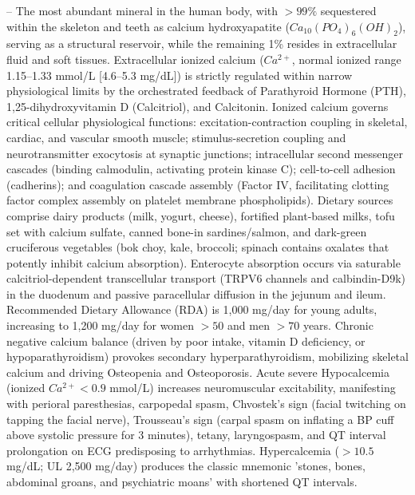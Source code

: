 -- The most abundant mineral in the human body, with $>99\%$ sequestered within the skeleton and teeth as calcium hydroxyapatite ($Ca_{10}(PO_4)_6(OH)_2$), serving as a structural reservoir, while the remaining 1\% resides in extracellular fluid and soft tissues. Extracellular ionized calcium ($Ca^{2+}$, normal ionized range 1.15--1.33 mmol/L [4.6--5.3 mg/dL]) is strictly regulated within narrow physiological limits by the orchestrated feedback of Parathyroid Hormone (PTH), 1,25-dihydroxyvitamin D (Calcitriol), and Calcitonin. Ionized calcium governs critical cellular physiological functions: excitation-contraction coupling in skeletal, cardiac, and vascular smooth muscle; stimulus-secretion coupling and neurotransmitter exocytosis at synaptic junctions; intracellular second messenger cascades (binding calmodulin, activating protein kinase C); cell-to-cell adhesion (cadherins); and coagulation cascade assembly (Factor IV, facilitating clotting factor complex assembly on platelet membrane phospholipids). Dietary sources comprise dairy products (milk, yogurt, cheese), fortified plant-based milks, tofu set with calcium sulfate, canned bone-in sardines/salmon, and dark-green cruciferous vegetables (bok choy, kale, broccoli; spinach contains oxalates that potently inhibit calcium absorption). Enterocyte absorption occurs via saturable calcitriol-dependent transcellular transport (TRPV6 channels and calbindin-D9k) in the duodenum and passive paracellular diffusion in the jejunum and ileum. Recommended Dietary Allowance (RDA) is 1,000 mg/day for young adults, increasing to 1,200 mg/day for women $>50$ and men $>70$ years. Chronic negative calcium balance (driven by poor intake, vitamin D deficiency, or hypoparathyroidism) provokes secondary hyperparathyroidism, mobilizing skeletal calcium and driving Osteopenia and Osteoporosis. Acute severe Hypocalcemia (ionized $Ca^{2+} < 0.9$ mmol/L) increases neuromuscular excitability, manifesting with perioral paresthesias, carpopedal spasm, Chvostek's sign (facial twitching on tapping the facial nerve), Trousseau's sign (carpal spasm on inflating a BP cuff above systolic pressure for 3 minutes), tetany, laryngospasm, and QT interval prolongation on ECG predisposing to arrhythmias. Hypercalcemia ($>10.5$ mg/dL; UL 2,500 mg/day) produces the classic mnemonic 'stones, bones, abdominal groans, and psychiatric moans' with shortened QT intervals.

